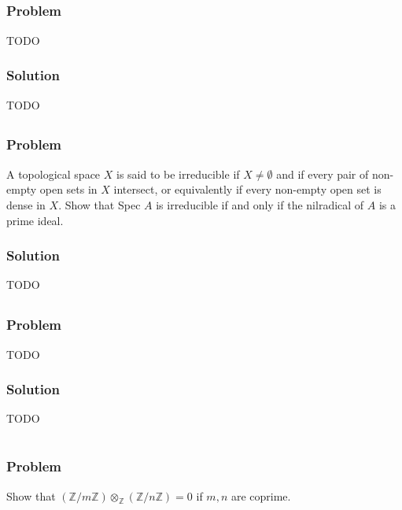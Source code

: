 \documentclass[book,12pt,oneside,openany]{memoir}
\begin{document}
\section{}
\subsection{Problem}
TODO
\subsection{Solution}
TODO


\section{}
\subsection{Problem}
A topological space $X$ is said to be irreducible if $X \neq \emptyset$ and if every pair of non-empty open sets in $X$ intersect, or equivalently if every non-empty open set is dense in $X$. Show that Spec $A$ is irreducible if and only if the nilradical of $A$ is a prime ideal.
\subsection{Solution}
TODO


\section{}
\subsection{Problem}
TODO
\subsection{Solution}
TODO


\chapter{}

\section{}
\subsection{Problem}
Show that $\left( \mathbb{Z}/m\mathbb{Z} \right) \otimes_{\mathbb{Z}}  \left( \mathbb{Z}/n\mathbb{Z} \right) = 0$ if $m,n$ are coprime.
\end{document}
